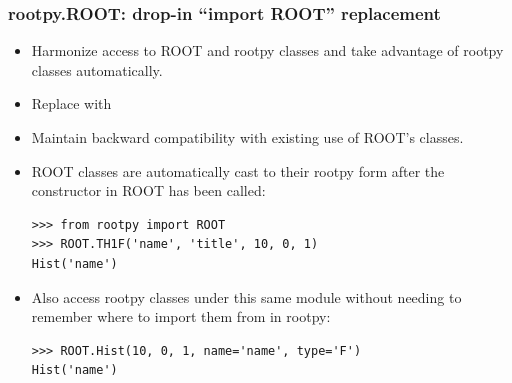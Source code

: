 \documentclass[10pt,professionalfonts,serif,usenames,dvipsnames,svgnames,table]{beamer}
\begin{document}
\begin{frame}[fragile]
    \frametitle{rootpy.ROOT: drop-in ``import ROOT'' replacement}

    \begin{itemize}
    \itemsep=0.3cm
\item Harmonize access to ROOT and rootpy classes and take advantage of rootpy classes automatically.

\item Replace  with 

\item Maintain backward compatibility with existing use of ROOT's classes.

\item ROOT classes are automatically cast to their rootpy form after the constructor in ROOT has been called:
    \begin{verbatim}
>>> from rootpy import ROOT
>>> ROOT.TH1F('name', 'title', 10, 0, 1)
Hist('name')
    \end{verbatim}

\item Also access rootpy classes under this same module without needing to remember where to import them from in rootpy:
    \begin{verbatim}
>>> ROOT.Hist(10, 0, 1, name='name', type='F')
Hist('name')
    \end{verbatim}
\end{itemize}

\end{frame}
\end{document}
